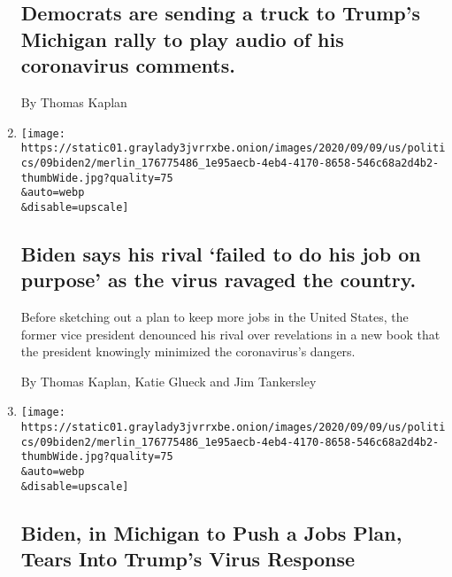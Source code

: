 \begin{enumerate}
  \hypertarget{democrats-are-sending-a-truck-to-trumps-michigan-rally-to-play-audio-of-his-coronavirus-comments}{%
  \subsection{Democrats are sending a truck to Trump's Michigan rally to
  play audio of his coronavirus
  comments.}\label{democrats-are-sending-a-truck-to-trumps-michigan-rally-to-play-audio-of-his-coronavirus-comments}}

  By Thomas Kaplan
\item
  \href{/2020/09/10/us/elections/biden-says-his-rival-failed-to-do-his-job-on-purpose-as-the-virus-ravaged-the-country.html}{}

  \texttt{[image: https://static01.graylady3jvrrxbe.onion/images/2020/09/09/us/politics/09biden2/merlin\_176775486\_1e95aecb-4eb4-4170-8658-546c68a2d4b2-thumbWide.jpg?quality=75\\\&auto=webp\\\&disable=upscale]}

  \hypertarget{biden-says-his-rival-failed-to-do-his-job-on-purpose-as-the-virus-ravaged-the-country}{%
  \subsection{Biden says his rival `failed to do his job on purpose' as
  the virus ravaged the
  country.}\label{biden-says-his-rival-failed-to-do-his-job-on-purpose-as-the-virus-ravaged-the-country}}

  Before sketching out a plan to keep more jobs in the United States,
  the former vice president denounced his rival over revelations in a
  new book that the president knowingly minimized the coronavirus's
  dangers.

  By Thomas Kaplan, Katie Glueck and Jim Tankersley
\item
  \href{/2020/09/09/us/politics/biden-trump-michigan-jobs-taxes.html}{}

  \texttt{[image: https://static01.graylady3jvrrxbe.onion/images/2020/09/09/us/politics/09biden2/merlin\_176775486\_1e95aecb-4eb4-4170-8658-546c68a2d4b2-thumbWide.jpg?quality=75\\\&auto=webp\\\&disable=upscale]}

  \hypertarget{biden-in-michigan-to-push-a-jobs-plan-tears-into-trumps-virus-response}{%
  \subsection{Biden, in Michigan to Push a Jobs Plan, Tears Into Trump's
  Virus
  Response}\label{biden-in-michigan-to-push-a-jobs-plan-tears-into-trumps-virus-response}}


\end{enumerate}
